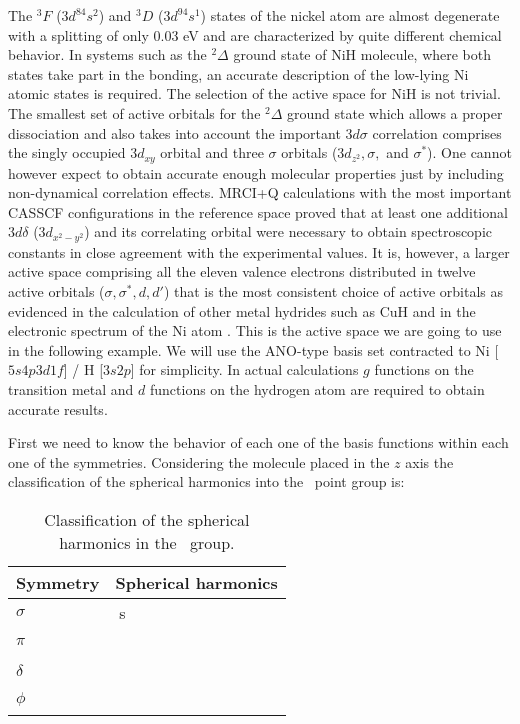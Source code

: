 The $^3F$ ($3d^84s^2$) and $^3D$ ($3d^94s^1$) states of the nickel
atom are almost degenerate with a splitting of only 0.03 eV \cite{Andersson:92c} and 
are characterized by quite different chemical behavior. In systems such as the 
$^2\Delta$ ground state of NiH molecule, where both states take part in the 
bonding, an accurate description of the low-lying Ni atomic states is required. 
The selection of the active space for NiH is not trivial. 
The smallest set of active orbitals for the $^2\Delta$ ground state which allows
a proper dissociation and also takes into account the important $3d\sigma$
correlation comprises the singly occupied $3d_{xy}$ orbital and three $\sigma$
orbitals ($3d_{z^2},\sigma,$ and $\sigma^*$). One cannot however expect to obtain 
accurate enough molecular properties just by including non-dynamical correlation
effects. MRCI+Q calculations with the most important CASSCF configurations
in the reference space proved that at least one additional $3d\delta$ ($3d_{x^2-y^2}$)
and its correlating orbital were necessary to obtain spectroscopic constants in close
agreement with the experimental values. It is, however, a larger active space comprising
all the eleven valence electrons distributed in twelve active orbitals 
($\sigma,\sigma^*,d,d'$) that is the most consistent choice of active orbitals as
evidenced in the calculation of other metal hydrides such as CuH \cite{Pou:94}
and in the electronic spectrum of the Ni atom \cite{Andersson:92c}. This is the
active space we are going to use in the following example. We will use the
ANO-type basis set contracted to Ni [$5s4p3d1f$] / H [$3s2p$] for simplicity. In
actual calculations $g$ functions on the transition metal and $d$ functions on
the hydrogen atom are required to
obtain accurate results.

First we need to know the behavior of each one of the basis functions
within each one of the symmetries. Considering the molecule placed in
the $z$ axis the classification of the spherical harmonics into the \Cinfv\
point group is:

\begin{table}[ht]
\begin{center}
\caption{\label{tab:cinfv}Classification of the spherical harmonics in the \Cinfv\ group.}
\begin{tabular}{lcccccc}
\\
Symmetry    &  \multicolumn{6}{c}{Spherical harmonics}\\
\hline
$\sigma$    &  s        & \pz\  & \dzt\  & \fztt\ \\
$\pi$       &  \px\     & \py\  & \dxz\  & \dyz\ & \fx\ & \fy\ \\
$\delta$    &  \dxtyt\ & \dxy\ & \fxyz\ & \fz\ \\
$\phi$      &  \fxtt\   & \fytt\ \\
\hline
\end{tabular}
\end{center}
\end{table}

